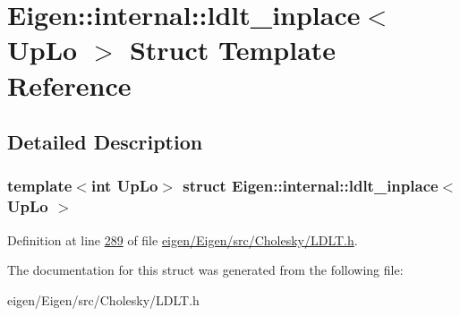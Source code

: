 \hypertarget{struct_eigen_1_1internal_1_1ldlt__inplace}{}\section{Eigen\+:\+:internal\+:\+:ldlt\+\_\+inplace$<$ Up\+Lo $>$ Struct Template Reference}
\label{struct_eigen_1_1internal_1_1ldlt__inplace}


\subsection{Detailed Description}
\subsubsection*{template$<$int Up\+Lo$>$\newline
struct Eigen\+::internal\+::ldlt\+\_\+inplace$<$ Up\+Lo $>$}



Definition at line \hyperlink{eigen_2_eigen_2src_2_cholesky_2_l_d_l_t_8h_source_l00289}{289} of file \hyperlink{eigen_2_eigen_2src_2_cholesky_2_l_d_l_t_8h_source}{eigen/\+Eigen/src/\+Cholesky/\+L\+D\+L\+T.\+h}.



The documentation for this struct was generated from the following file\+:\begin{DoxyCompactItemize}
\item 
eigen/\+Eigen/src/\+Cholesky/\+L\+D\+L\+T.\+h\end{DoxyCompactItemize}
